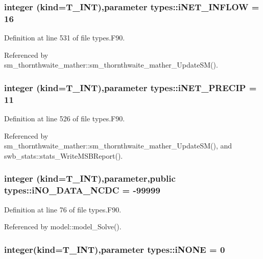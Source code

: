 \hypertarget{namespacetypes_a42742629ae90d31afa09e1250d647875}{
\subsubsection[{iNET\_\-INFLOW}]{\setlength{\rightskip}{0pt plus 5cm}integer (kind={\bf T\_\-INT}),parameter {\bf types::iNET\_\-INFLOW} = 16}}
\label{namespacetypes_a42742629ae90d31afa09e1250d647875}


Definition at line 531 of file types.F90.



Referenced by sm\_\-thornthwaite\_\-mather::sm\_\-thornthwaite\_\-mather\_\-UpdateSM().

\hypertarget{namespacetypes_a5f9046fed07889a2ac6a854e9563e96a}{
\subsubsection[{iNET\_\-PRECIP}]{\setlength{\rightskip}{0pt plus 5cm}integer (kind={\bf T\_\-INT}),parameter {\bf types::iNET\_\-PRECIP} = 11}}
\label{namespacetypes_a5f9046fed07889a2ac6a854e9563e96a}


Definition at line 526 of file types.F90.



Referenced by sm\_\-thornthwaite\_\-mather::sm\_\-thornthwaite\_\-mather\_\-UpdateSM(), and swb\_\-stats::stats\_\-WriteMSBReport().

\hypertarget{namespacetypes_ad9741d8d6e8a33ba13e4b3f00c94d5fa}{
\subsubsection[{iNO\_\-DATA\_\-NCDC}]{\setlength{\rightskip}{0pt plus 5cm}integer (kind={\bf T\_\-INT}),parameter,public {\bf types::iNO\_\-DATA\_\-NCDC} = -\/99999}}
\label{namespacetypes_ad9741d8d6e8a33ba13e4b3f00c94d5fa}


Definition at line 76 of file types.F90.



Referenced by model::model\_\-Solve().

\hypertarget{namespacetypes_a000bcd3b779441ad55f9fa83e6522f24}{
\subsubsection[{iNONE}]{\setlength{\rightskip}{0pt plus 5cm}integer(kind={\bf T\_\-INT}),parameter {\bf types::iNONE} = 0}}
\label{namespacetypes_a000bcd3b779441ad55f9fa83e6522f24}


